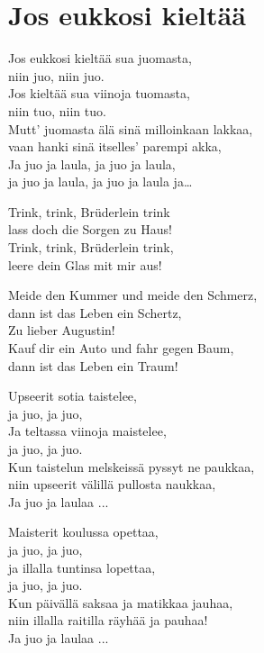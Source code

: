 \section{Jos eukkosi kieltää}

Jos eukkosi kieltää sua juomasta,\\
niin juo, niin juo.\\
Jos kieltää sua viinoja tuomasta,\\
niin tuo, niin tuo.\\
Mutt' juomasta älä sinä milloinkaan lakkaa,\\
vaan hanki sinä itselles' parempi akka,\\
Ja juo ja laula, ja juo ja laula,\\
ja juo ja laula, ja juo ja laula ja…

Trink, trink, Brüderlein trink\\
lass doch die Sorgen zu Haus!\\
Trink, trink, Brüderlein trink,\\
leere dein Glas mit mir aus!

Meide den Kummer und meide den Schmerz,\\
dann ist das Leben ein Schertz,\\
Zu lieber Augustin!\\
Kauf dir ein Auto und fahr gegen Baum,\\
dann ist das Leben ein Traum!

Upseerit sotia taistelee,\\
ja juo, ja juo,\\
Ja teltassa viinoja maistelee,\\
ja juo, ja juo.\\
Kun taistelun melskeissä pyssyt ne paukkaa,\\
niin upseerit välillä pullosta naukkaa,\\
Ja juo ja laulaa ...

Maisterit koulussa opettaa,\\
ja juo, ja juo,\\
ja illalla tuntinsa lopettaa,\\
ja juo, ja juo.\\
Kun päivällä saksaa ja matikkaa jauhaa,\\
niin illalla raitilla räyhää ja pauhaa!\\
Ja juo ja laulaa ...